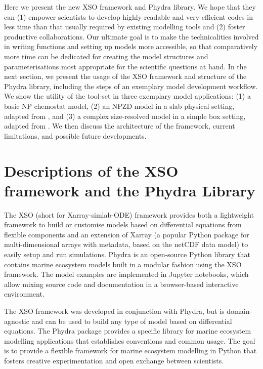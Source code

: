 \documentclass[journal abbreviation, manuscript]{copernicus}
\begin{document}
Here we present the new XSO framework and Phydra library. We hope that they can (1) empower scientists to develop highly readable and very efficient codes in less time than that usually required by existing modelling tools and (2) foster productive collaborations. Our ultimate goal is to make the technicalities involved in writing functions and setting up models more accessible, so that comparatively more time can be dedicated for creating the model structures and parameterisations most appropriate for the scientific questions at hand. In the next section, we present the usage of the XSO framework and structure of the Phydra library, including the steps of an exemplary model development workflow. We show the utility of the tool-set in three exemplary model applications: (1) a basic NP chemostat model, (2) an NPZD model in a slab physical setting, adapted from \citet{Anderson2015c}, and (3) a complex size-resolved model in a simple box setting, adapted from \citet{Banas2011b}. We then discuss the architecture of the framework, current limitations, and possible future developments.



\section{Descriptions of the XSO framework and the Phydra Library} \label{Section:phydrapackage}

The XSO (short for Xarray-simlab-ODE) framework provides both a lightweight framework to build or customise models based on differential equations from flexible components and an extension of Xarray (a popular Python package for multi-dimensional arrays with metadata, based on the netCDF data model) to easily setup and run simulations. Phydra is an open-source Python library that contains marine ecosystem models built in a modular fashion using the XSO framework. The model examples are implemented in Jupyter notebooks, which allow mixing source code and documentation in a browser-based interactive environment. 

The XSO framework was developed in conjunction with Phydra, but is domain-agnostic and can be used to build any type of model based on differential equations. The Phydra package provides a specific library for marine ecosystem modelling applications that establishes conventions and common usage. The goal is to provide a flexible framework for marine ecosystem modelling in Python that fosters creative experimentation and open exchange between scientists.
\end{document}
